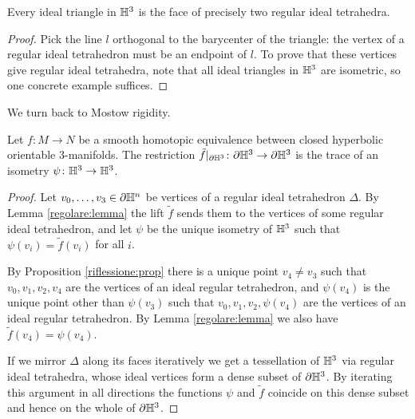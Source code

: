 \begin{prop} \label{riflessione:prop}
Every ideal triangle in $\mathbb{H}^3$ is the face of precisely two regular ideal tetrahedra.
\end{prop}
\begin{proof}
Pick the line $l$ orthogonal to the barycenter of the triangle: the vertex of a regular ideal tetrahedron must be an endpoint of $l$. To prove that these vertices give regular ideal tetrahedra, note that all ideal triangles in $\mathbb{H}^3$ are isometric, so one concrete example suffices. 
\end{proof}

We turn back to Mostow rigidity.

\begin{prop}
Let $f\colon M \to N$ be a smooth homotopic equivalence between closed hyperbolic orientable 3-manifolds.  
The restriction $\tilde f|_{\partial \mathbb{H}^3}\colon \partial \mathbb{H}^3 \to \partial \mathbb{H}^3$ is the trace of an isometry $\psi\colon \mathbb{H}^3 \to \mathbb{H}^3$.
\end{prop}
\begin{proof}
Let $v_0,\ldots, v_3\in\partial \mathbb{H}^n$ be vertices of a regular ideal tetrahedron $\Delta$. By Lemma \ref{regolare:lemma} the lift $\tilde f$ sends them to the vertices of some regular ideal tetrahedron, and let $\psi$ be the unique isometry of $\mathbb{H}^3$ such that $\psi (v_i) = \tilde f(v_i)$ for all $i$. 

By Proposition \ref{riflessione:prop} there is a unique point $v_4\neq v_3$ such that $v_0, v_1, v_2, v_4$ are the vertices of an ideal regular tetrahedron, and $\psi (v_4)$ is the unique point other than $\psi(v_3)$ such that $v_0,v_1,v_2, \psi(v_4)$ are the vertices of an ideal regular tetrahedron. By Lemma \ref{regolare:lemma} we also have $\tilde f(v_4) = \psi(v_4)$.

If we mirror $\Delta$ along its faces iteratively we get a tessellation of $\mathbb{H}^3$ via regular ideal tetrahedra, whose ideal vertices form a dense subset of $\partial \mathbb{H}^3$. By iterating this argument in all directions the functions $\psi$ and $\tilde f$ coincide on this dense subset and hence on the whole of $\partial \mathbb{H}^3$.
\end{proof}


